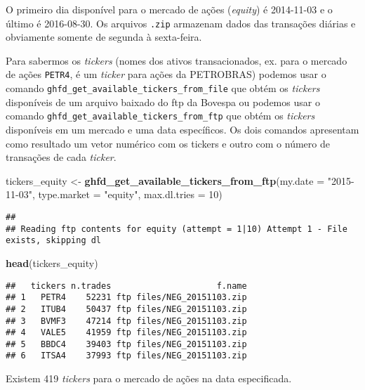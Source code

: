 \documentclass[]{article}
\newenvironment{Shaded}{\begin{snugshade}}{\end{snugshade}}
\newcommand{\KeywordTok}[1]{\textcolor[rgb]{0.13,0.29,0.53}{\textbf{{#1}}}}
\newcommand{\DataTypeTok}[1]{\textcolor[rgb]{0.13,0.29,0.53}{{#1}}}
\newcommand{\DecValTok}[1]{\textcolor[rgb]{0.00,0.00,0.81}{{#1}}}
\newcommand{\StringTok}[1]{\textcolor[rgb]{0.31,0.60,0.02}{{#1}}}
\newcommand{\NormalTok}[1]{{#1}}
\begin{document}
O primeiro dia disponível para o mercado de ações (\emph{equity}) é
2014-11-03 e o último é 2016-08-30. Os arquivos \texttt{.zip} armazenam
dados das transações diárias e obviamente somente de segunda à
sexta-feira.

Para sabermos os \emph{tickers} (nomes dos ativos transacionados, ex.
para o mercado de ações \texttt{PETR4}, é um \emph{ticker} para ações da
PETROBRAS) podemos usar o comando
\texttt{ghfd\_get\_available\_tickers\_from\_file} que obtém os
\emph{tickers} disponíveis de um arquivo baixado do ftp da Bovespa ou
podemos usar o comando \texttt{ghfd\_get\_available\_tickers\_from\_ftp}
que obtém os \emph{tickers} disponíveis em um mercado e uma data
específicos. Os dois comandos apresentam como resultado um vetor
numérico com os tickers e outro com o número de transações de cada
\emph{ticker}.

\begin{Shaded}
\begin{Highlighting}[]
\NormalTok{tickers_equity <-}\StringTok{ }\KeywordTok{ghfd_get_available_tickers_from_ftp}\NormalTok{(}\DataTypeTok{my.date =} \StringTok{"2015-11-03"}\NormalTok{, }
    \DataTypeTok{type.market =} \StringTok{"equity"}\NormalTok{, }\DataTypeTok{max.dl.tries =} \DecValTok{10}\NormalTok{)}
\end{Highlighting}
\end{Shaded}

\begin{verbatim}
## 
## Reading ftp contents for equity (attempt = 1|10) Attempt 1 - File exists, skipping dl
\end{verbatim}

\begin{Shaded}
\begin{Highlighting}[]
\KeywordTok{head}\NormalTok{(tickers_equity)}
\end{Highlighting}
\end{Shaded}

\begin{verbatim}
##   tickers n.trades                     f.name
## 1   PETR4    52231 ftp files/NEG_20151103.zip
## 2   ITUB4    50437 ftp files/NEG_20151103.zip
## 3   BVMF3    47214 ftp files/NEG_20151103.zip
## 4   VALE5    41959 ftp files/NEG_20151103.zip
## 5   BBDC4    39403 ftp files/NEG_20151103.zip
## 6   ITSA4    37993 ftp files/NEG_20151103.zip
\end{verbatim}

Existem 419 \emph{tickers} para o mercado de ações na data especificada.
\end{document}
